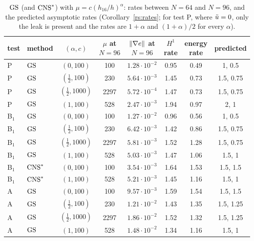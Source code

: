 \begin{table}[t]
\centering\small
\caption{$\mathrm{GS}$ (and $\mathrm{CNS}^\ast$) with $\mu=c(h_{16}/h)^\alpha$: rates between $N=64$ and $N=96$, and the predicted asymptotic rates (Corollary~\ref{rs:rates}; for test P, where $\tilde u=0$, only the leak is present and the rates are $1+\alpha$ and $(1+\alpha)/2$ for every $\alpha$).}\label{rs:tab:rates}
\begin{tabular}{llcccccc}
\toprule
test & method & $(\alpha,c)$ & $\mu$ at $N=96$ & $\lVert \nabla e\rVert$ at $N=96$ & $H^1$ rate & energy rate & predicted\\
\midrule
P & $\mathrm{GS}$ & $(0,100)$ & 100 & $1.28\cdot10^{-2}$ & 0.95 & 0.49 & 1, 0.5\\
P & $\mathrm{GS}$ & $(\frac12,100)$ & 230 & $5.64\cdot10^{-3}$ & 1.45 & 0.73 & 1.5, 0.75\\
P & $\mathrm{GS}$ & $(\frac12,1000)$ & 2297 & $5.72\cdot10^{-4}$ & 1.47 & 0.73 & 1.5, 0.75\\
P & $\mathrm{GS}$ & $(1,100)$ & 528 & $2.47\cdot10^{-3}$ & 1.94 & 0.97 & 2, 1\\
\midrule
B$_1$ & $\mathrm{GS}$ & $(0,100)$ & 100 & $1.27\cdot10^{-2}$ & 0.96 & 0.56 & 1, 0.5\\
B$_1$ & $\mathrm{GS}$ & $(\frac12,100)$ & 230 & $6.42\cdot10^{-3}$ & 1.42 & 0.86 & 1.5, 0.75\\
B$_1$ & $\mathrm{GS}$ & $(\frac12,1000)$ & 2297 & $5.81\cdot10^{-3}$ & 1.52 & 1.28 & 1.5, 0.75\\
B$_1$ & $\mathrm{GS}$ & $(1,100)$ & 528 & $5.03\cdot10^{-3}$ & 1.47 & 1.06 & 1.5, 1\\
B$_1$ & $\mathrm{CNS}^\ast$ & $(0,100)$ & 100 & $3.54\cdot10^{-3}$ & 1.64 & 1.53 & 1.5, 1.5\\
B$_1$ & $\mathrm{CNS}^\ast$ & $(1,100)$ & 528 & $5.21\cdot10^{-3}$ & 1.45 & 1.16 & 1.5, 1\\
\midrule
A & $\mathrm{GS}$ & $(0,100)$ & 100 & $9.57\cdot10^{-3}$ & 1.59 & 1.54 & 1.5, 1.5\\
A & $\mathrm{GS}$ & $(\frac12,100)$ & 230 & $1.21\cdot10^{-2}$ & 1.43 & 1.35 & 1.5, 1.25\\
A & $\mathrm{GS}$ & $(\frac12,1000)$ & 2297 & $1.86\cdot10^{-2}$ & 1.52 & 1.32 & 1.5, 1.25\\
A & $\mathrm{GS}$ & $(1,100)$ & 528 & $1.48\cdot10^{-2}$ & 1.34 & 1.16 & 1.5, 1\\
\bottomrule
\end{tabular}
\end{table}


